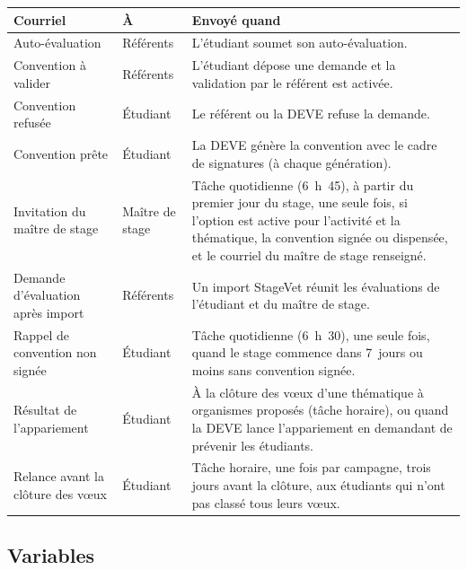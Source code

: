 \documentclass[11pt,a4paper]{article}
\begin{document}
\begin{center}
\small
\begin{tabularx}{\linewidth}{@{}>{\raggedright\arraybackslash}p{3.6cm} l X@{}}
\toprule
\textbf{Courriel} & \textbf{À} & \textbf{Envoyé quand} \\
\midrule
Auto-évaluation & Référents & L'étudiant soumet son auto-évaluation. \\
Convention à valider & Référents & L'étudiant dépose une demande et la validation par le référent est activée. \\
Convention refusée & Étudiant & Le référent ou la DEVE refuse la demande. \\
Convention prête & Étudiant & La DEVE génère la convention avec le cadre de signatures (à chaque génération). \\
Invitation du maître de stage & Maître de stage & Tâche quotidienne (6~h~45), à partir du premier jour du stage, une seule fois, si l'option est active pour l'activité et la thématique, la convention signée ou dispensée, et le courriel du maître de stage renseigné. \\
Demande d'évaluation après import & Référents & Un import StageVet réunit les évaluations de l'étudiant et du maître de stage. \\
Rappel de convention non signée & Étudiant & Tâche quotidienne (6~h~30), une seule fois, quand le stage commence dans 7~jours ou moins sans convention signée. \\
Résultat de l'appariement & Étudiant & À la clôture des vœux d'une thématique à organismes proposés (tâche horaire), ou quand la DEVE lance l'appariement en demandant de prévenir les étudiants. \\
Relance avant la clôture des vœux & Étudiant & Tâche horaire, une fois par campagne, trois jours avant la clôture, aux étudiants qui n'ont pas classé tous leurs vœux. \\
\bottomrule
\end{tabularx}
\end{center}

\subsection{Variables}
\label{sec:variables}
\end{document}
